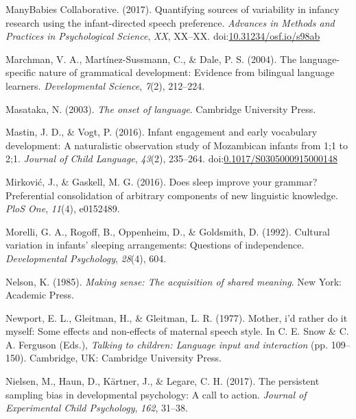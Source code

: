 \documentclass[floatsintext,man]{apa6}
\theoremstyle{definition}
\theoremstyle{definition}
\theoremstyle{definition}
\theoremstyle{remark}
\begin{document}
\hypertarget{ref-manybabies2017}{}
ManyBabies Collaborative. (2017). Quantifying sources of variability in
infancy research using the infant-directed speech preference.
\emph{Advances in Methods and Practices in Psychological Science},
\emph{XX}, XX--XX.
doi:\href{https://doi.org/10.31234/osf.io/s98ab}{10.31234/osf.io/s98ab}

\hypertarget{ref-marchman2004language}{}
Marchman, V. A., Martínez-Sussmann, C., \& Dale, P. S. (2004). The
language-specific nature of grammatical development: Evidence from
bilingual language learners. \emph{Developmental Science}, \emph{7}(2),
212--224.

\hypertarget{ref-masataka2003onset}{}
Masataka, N. (2003). \emph{The onset of language}. Cambridge University
Press.

\hypertarget{ref-mastin2016infant}{}
Mastin, J. D., \& Vogt, P. (2016). Infant engagement and early
vocabulary development: A naturalistic observation study of Mozambican
infants from 1;1 to 2;1. \emph{Journal of Child Language}, \emph{43}(2),
235--264.
doi:\href{https://doi.org/0.1017/S0305000915000148}{0.1017/S0305000915000148}

\hypertarget{ref-mirkovic2016does}{}
Mirković, J., \& Gaskell, M. G. (2016). Does sleep improve your grammar?
Preferential consolidation of arbitrary components of new linguistic
knowledge. \emph{PloS One}, \emph{11}(4), e0152489.

\hypertarget{ref-morelli1992cultural}{}
Morelli, G. A., Rogoff, B., Oppenheim, D., \& Goldsmith, D. (1992).
Cultural variation in infants' sleeping arrangements: Questions of
independence. \emph{Developmental Psychology}, \emph{28}(4), 604.

\hypertarget{ref-nelson1985making}{}
Nelson, K. (1985). \emph{Making sense: The acquisition of shared
meaning}. New York: Academic Press.

\hypertarget{ref-newport1977mother}{}
Newport, E. L., Gleitman, H., \& Gleitman, L. R. (1977). Mother, i'd
rather do it myself: Some effects and non-effects of maternal speech
style. In C. E. Snow \& C. A. Ferguson (Eds.), \emph{Talking to
children: Language input and interaction} (pp. 109--150). Cambridge, UK:
Cambridge University Press.

\hypertarget{ref-nielsen2017persistent}{}
Nielsen, M., Haun, D., Kärtner, J., \& Legare, C. H. (2017). The
persistent sampling bias in developmental psychology: A call to action.
\emph{Journal of Experimental Child Psychology}, \emph{162}, 31--38.
\end{document}
